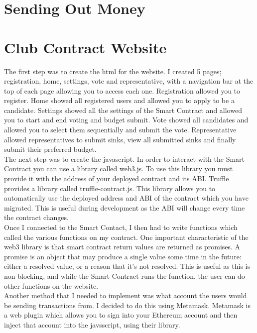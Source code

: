\section{Sending Out Money}
\section{Club Contract Website}
The first step was to create the html for the website. I created 5 pages; registration, home, settings, vote and representative, with a navigation bar at the top of each page allowing you to access each one. Registration allowed you to register. Home showed all registered users and allowed you to apply to be a candidate. Settings showed all the settings of the Smart Contract and allowed you to start and end voting and budget submit. Vote showed all candidates and allowed you to select them sequentially and submit the vote. Representative allowed representatives to submit sinks, view all submitted sinks and finally submit their preferred budget. \\
 The next step was to create the javascript. In order to interact with the Smart Contract you can use a library called web3.js. To use this library you must provide it with the address of your deployed contract and its ABI. Truffle provides a library called truffle-contract.js. This library allows you to automatically use the deployed address and ABI of the contract which you have migrated. This is useful during development  as the ABI will change every time the contract changes. \\
Once I connected to the Smart Contact, I then had to write functions which called the various functions on my contract. One important characteristic of the web3 library is that smart contract return values are returned as promises. A promise is an object that may produce a single value some time in the future: either a resolved value, or a reason that it’s not resolved. This is useful as this is non-blocking, and while the Smart Contract runs the function, the user can do other functions on the website. \\
Another method that I needed to implement was what account the users would be sending transactions from. I decided to do this using Metamask. Metamask is a web plugin which allows you to sign into your Ethereum account and then inject that account into the javsscript, using their library.